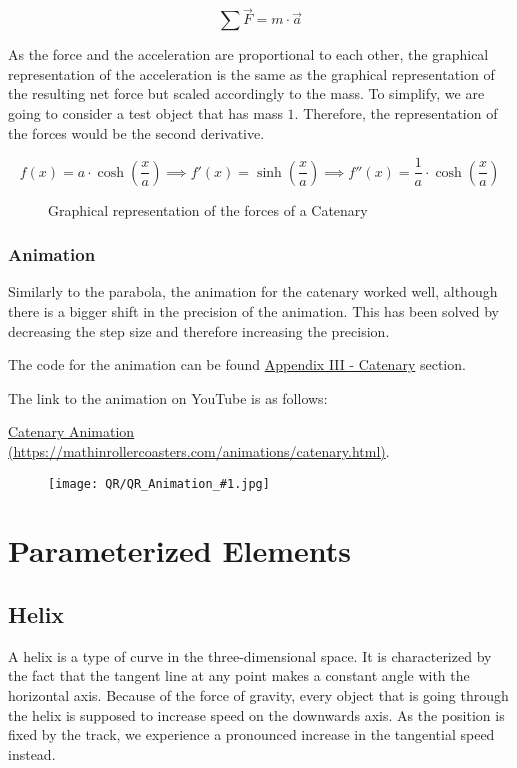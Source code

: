 \documentclass[12pt,twoside,a4paper]{article}
\newcommand{\link}[1]{https://mathinrollercoasters.com/animations/#1.html}
\newcommand{\LinkToAnimation}[2]{
\noindent The code for the animation can be found \hyperref[sec:Appendix III_#1]{Appendix III - #1} section.

\noindent The link to the animation on YouTube is as follows:
	
\noindent \href{\link{#2}}{#1 Animation (\link{#2})}.
	
\begin{figure}[H]
	\centering
	\texttt{[image: QR/QR\_Animation\_\#1.jpg]}
\end{figure}
}
\begin{document}
	$$\sum \vec{F} = m \cdot \vec{a}$$
	
	As the force and the acceleration are proportional to each other, the graphical representation of the acceleration is the same as the graphical representation of the resulting net force but scaled accordingly to the mass. To simplify, we are going to consider a test object that has mass $1$. Therefore, the representation of the forces would be the second derivative.
	
	$$f(x) = a \cdot \cosh\left(\frac{x}{a}\right) \implies f'(x) = \sinh\left(\frac{x}{a}\right) \implies f''(x) = \frac{1}{a} \cdot \cosh\left(\frac{x}{a}\right)$$
	
	\begin{figure}[H]
		\centering
		\caption{Graphical representation of the forces of a Catenary}
		\label{graph:CatenaryForces}
	\end{figure}
	
	\subsubsection{Animation}
	Similarly to the parabola, the animation for the catenary worked well, although there is a bigger shift in the precision of the animation. This has been solved by decreasing the step size and therefore increasing the precision.
	
	\LinkToAnimation{Catenary}{catenary}
	
	\cleardoublepage
	
	\section{Parameterized Elements}
	
	\subsection{Helix}
	A helix is a type of curve in the three-dimensional space. It is characterized by the fact that the tangent line at any point makes a constant angle with the horizontal axis. Because of the force of gravity, every object that is going through the helix is supposed to increase speed on the downwards axis. As the position is fixed by the track, we experience a pronounced increase in the tangential speed instead.
	
\end{document}
